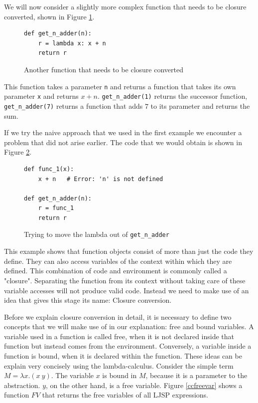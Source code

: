 \documentclass[11pt]{report}
\begin{document}
We will now consider a slightly more complex function that needs to be closure converted, shown in Figure \ref{cc3}.

\begin{figure}[ht]
\begin{lstlisting}
def get_n_adder(n):
    r = lambda x: x + n
    return r
\end{lstlisting}
\caption{Another function that needs to be closure converted}
\label{cc3}
\end{figure}

This function takes a parameter \texttt{n} and returns a function that takes its own parameter \texttt{x} and returns $x+n$. \texttt{get_n_adder(1)} returns the successor function, \texttt{get_n_adder(7)} returns a function that adds $7$ to its parameter and returns the sum.

If we try the naive approach that we used in the first example we encounter a problem that did not arise earlier. The code that we would obtain is shown in Figure \ref{cc4}.

\begin{figure}[ht]
\begin{lstlisting}
def func_1(x):
    x + n   # Error: 'n' is not defined
    
def get_n_adder(n):
    r = func_1
    return r
\end{lstlisting}
\caption{Trying to move the lambda out of \texttt{get_n_adder}}
\label{cc4}
\end{figure}

This example shows that function objects consist of more than just the code they define. They can also access variables of the context within which they are defined. This combination of code and environment is commonly called a "closure". Separating the function from its context without taking care of these variable accesses will not produce valid code. Instead we need to make use of an idea that gives this stage its name: Closure conversion.

Before we explain closure conversion in detail, it is necessary to define two concepts that we will make use of in our explanation: free and bound variables. A variable used in a function is called free, when it is not declared inside that function but instead comes from the environment. Conversely, a variable inside a function is bound, when it is declared within the function. These ideas can be explain very concisely using the lambda-calculus. Consider the simple term $M = \lambda x.(x\ y)$. The variable $x$ is bound in $M$, because it is a parameter to the abstraction. $y$, on the other hand, is a free variable. Figure \ref{ccfreevar} shows a function $FV$ that returns the free variables of all LJSP expressions.
\end{document}

